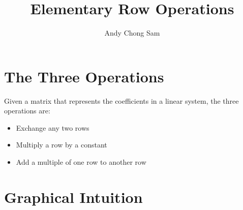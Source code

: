 \documentclass{article}
\begin{document}
	
	\title{Elementary Row Operations}
	\author{Andy Chong Sam}	
	\maketitle	
	
\section {The Three Operations}

\par \noindent Given a matrix that represents the coefficients in a linear system, the three operations are:

\begin{itemize}
  \item Exchange any two rows
  \item Multiply a row by a constant
  \item Add a multiple of one row to another row

\end{itemize}

\section {Graphical Intuition}
\end{document}
